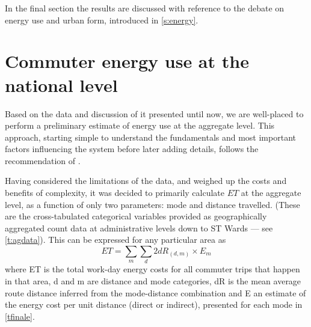 In the final section the results are discussed with
reference to the debate on energy use and urban form, introduced in
\cref{s:energy}. %

\section{Commuter energy use at the national level} \label{snational}
Based on the data and discussion of it presented until now, we are
well-placed to perform a preliminary estimate of energy use at the aggregate level.
This approach, starting simple to understand the fundamentals and most important
factors influencing the system before later adding details, follows the
recommendation of \citet{batty1976urban}.

Having considered the limitations of the data, and weighed up the
costs and benefits of complexity, it was decided to
primarily calculate $ET$ at the aggregate level,
as a function of only two parameters: mode and distance travelled.
(These are the cross-tabulated categorical variables provided as geographically
aggregated count data at administrative levels down to ST Wards ---
see \cref{t:agdata}). This can be expressed for any particular area as
\begin{equation}
 ET = \sum_m \sum_d{2dR_{(d,m)} \times E_m}
 \label{eqet1}
\end{equation}
where ET is the total work-day energy costs for all commuter trips that happen
in that area, d and m are distance and mode categories, dR is the mean average
route distance inferred from the mode-distance combination and E an
estimate of the
energy cost per unit distance (direct or indirect), presented for each mode
in \cref{tfinale}.

